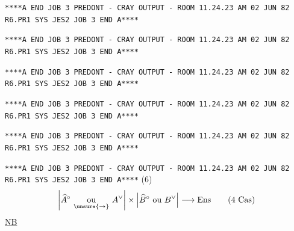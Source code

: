 \texttt{****A END JOB 3 PREDONT - CRAY OUTPUT - ROOM 11.24.23 AM 02 JUN 82 R6.PR1 SYS JES2 JOB 3 END A****}

\texttt{****A END JOB 3 PREDONT - CRAY OUTPUT - ROOM 11.24.23 AM 02 JUN 82 R6.PR1 SYS JES2 JOB 3 END A****}

\texttt{****A END JOB 3 PREDONT - CRAY OUTPUT - ROOM 11.24.23 AM 02 JUN 82 R6.PR1 SYS JES2 JOB 3 END A****}

\texttt{****A END JOB 3 PREDONT - CRAY OUTPUT - ROOM 11.24.23 AM 02 JUN 82 R6.PR1 SYS JES2 JOB 3 END A****}

\texttt{****A END JOB 3 PREDONT - CRAY OUTPUT - ROOM 11.24.23 AM 02 JUN 82 R6.PR1 SYS JES2 JOB 3 END A****}

\texttt{****A END JOB 3 PREDONT - CRAY OUTPUT - ROOM 11.24.23 AM 02 JUN 82 R6.PR1 SYS JES2 JOB 3 END A****}
\quad(6)
\[
\left|\widehat A^\circ\ \underset{\unsure{\rightarrow}}{\text{ou}}\ A^\vee\right|
\times\left|\widehat B^\circ\ \text{ou}\ B^\vee\right|\longrightarrow\mathrm{Ens}
\qquad(4\text{ Cas})
\]
\uline{NB}

